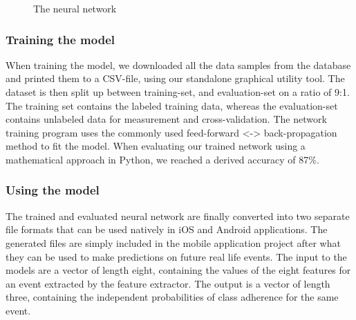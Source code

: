 \documentclass[12pt, a4paper, onecolumn]{article}
\begin{document}
	\begin{figure}[H]
		\centering
		\caption{The neural network}%
		\label{fig:neural-network}%
	\end{figure}
	
	\subsubsection{Training the model}
	When training the model, we downloaded all the data samples from the database and printed them to a CSV-file, using our standalone graphical utility tool. The dataset is then split up between training-set, and evaluation-set on a ratio of 9:1. The training set contains the labeled training data, whereas the evaluation-set contains unlabeled data for measurement and cross-validation. The network training program uses the commonly used feed-forward <-> back-propagation method \cite{neural_networks} to fit the model. When evaluating our trained network using a mathematical approach in Python, we reached a derived accuracy of 87\%.
	
	\subsubsection{Using the model}
	The trained and evaluated neural network are finally converted into two separate file formats that can be used natively in iOS and Android applications. The generated files are simply included in the mobile application project after what they can be used to make predictions on future real life events. The input to the models are a vector of length eight, containing the values of the eight features for an event extracted by the feature extractor. The output is a vector of length three, containing the independent probabilities of class adherence for the same event. 
	
\end{document}
